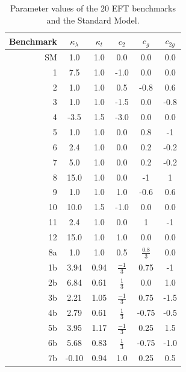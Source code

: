 \begin{table}[h]
  \begin{center}
    \begin{tabular}{r|ccccc}
      Benchmark & $\kappa_{\lambda}$ & $\kappa_{t}$ & $c_{2}$	& $c_{g}$ & $c_{2g}$ \\ \hline
      SM &	1.0 & 1.0	 &	0.0		& 0.0	& 0.0 \\ \hline
      1 &	7.5	 & 1.0	 &	-1.0	& 0.0	& 0.0 \\
      2 &	1.0	 & 1.0	 &	0.5		& -0.8	& 0.6 \\
      3 &	1.0	 & 1.0	 &	-1.5	& 0.0	& -0.8 \\
      4 &	-3.5 & 1.5  &	-3.0	& 0.0	& 0.0 \\
      5 &	1.0	 & 1.0	 &	0.0		& 0.8	& -1 \\
      6 &	2.4	 & 1.0	 &	0.0		& 0.2	& -0.2 \\
      7 &	5.0	 & 1.0	 &	0.0		& 0.2	& -0.2 \\
      8 &	15.0 & 1.0	 &	0.0		& -1	& 1 \\
      9 &	1.0	 & 1.0	 &	1.0		& -0.6	& 0.6 \\
      10 &	10.0 & 1.5   &	-1.0	& 0.0	& 0.0 \\
      11 &	2.4	 & 1.0	 &	0.0		& 1		& -1 \\
      12 &	15.0 & 1.0	 &	1.0		& 0.0	& 0.0 \\[0.5ex] \hline 
      8a &  1.0  & 1.0   &  0.5   & $\frac{0.8}{3}$ & 0.0 \\[0.5ex] 
      1b &  3.94 & 0.94  & $\frac{-1}{3}$ & 0.75 & -1 \\[0.5ex] 
      2b &   6.84 & 0.61 &  $\frac{1}{3}$ &  0.0 & 1.0 \\[0.5ex] 
      3b &   2.21 & 1.05 & $\frac{-1}{3}$ &  0.75 &  -1.5 \\[0.5ex] 
      4b &   2.79 & 0.61 &  $\frac{1}{3}$ & -0.75 &  -0.5 \\[0.5ex] 
      5b &   3.95 & 1.17 & $\frac{-1}{3}$ & 0.25 &  1.5 \\[0.5ex] 
      6b &   5.68 & 0.83 &  $\frac{1}{3}$ & -0.75 &  -1.0 \\[0.5ex] 
      7b &   -0.10 & 0.94 &         1.0 & 0.25 & 0.5 \\
    \end{tabular}
  \end{center}
  \caption{Parameter values of the 20 EFT benchmarks and the Standard Model. \label{tab:eft_bench}}
\end{table}
